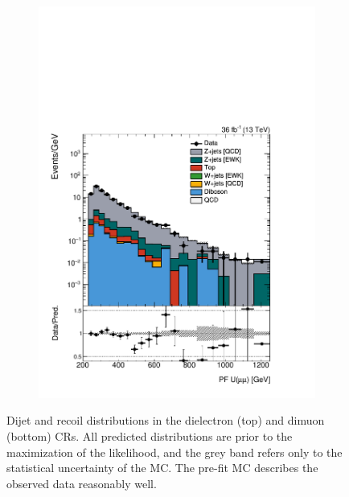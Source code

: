 \begin{figure}[]
\begin{center}
\begin{subfigure}[t]{0.24\textwidth}
            \includegraphics[width=\textwidth]{figures/vbf/prefit/dimuon_pfUZmag_logy.pdf}
        \end{subfigure}
        \caption{Dijet and recoil distributions in the dielectron (top) and dimuon (bottom) CRs.
                 All predicted distributions are prior to the maximization of the likelihood, and the grey band refers only to the statistical uncertainty of the MC.
                 The pre-fit MC describes the observed data reasonably well.
        }
        \label{fig:vbf:zcr}
    \end{center}
\end{figure}

